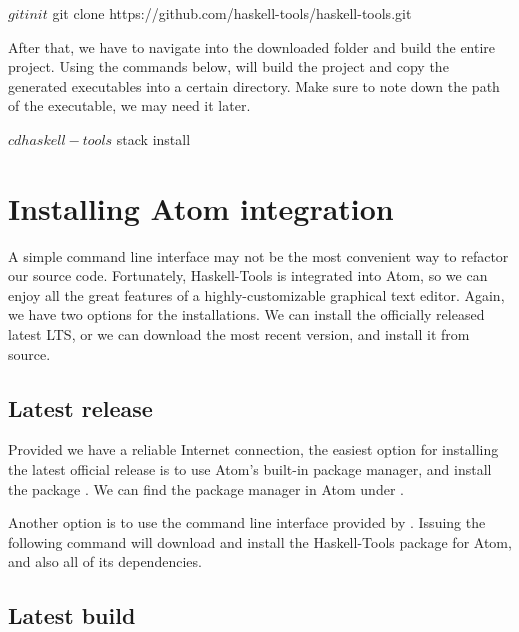 \documentclass[main.tex]{subfiles}
\begin{document}
	\begin{bash}
		$ git init
		$ git clone https://github.com/haskell-tools/haskell-tools.git
	\end{bash}
	
	After that, we have to navigate into the downloaded folder and build the entire project. Using the commands below,  will build the project and copy the generated executables into a certain directory. Make sure to note down the path of the  executable, we may need it later.
	
	\begin{bash}
		$ cd haskell-tools
		$ stack install
	\end{bash}
	
	\section{Installing Atom integration}
	
	A simple command line interface may not be the most convenient way to refactor our source code. Fortunately, Haskell-Tools is integrated into Atom, so we can enjoy all the great features of a highly-customizable graphical text editor. Again, we have two options for the installations. We can install the officially released latest LTS, or we can download the most recent version, and install it from source.
	
	\subsection{Latest release}
	
	Provided we have a reliable Internet connection, the easiest option for installing the latest official release is to use Atom's built-in package manager, and install the package . We can find the package manager in Atom under .
	
	Another option is to use the command line interface provided by . Issuing the following command will download and install the Haskell-Tools package for Atom, and also all of its dependencies.
	
	
	\subsection{Latest build}
	
\end{document}

